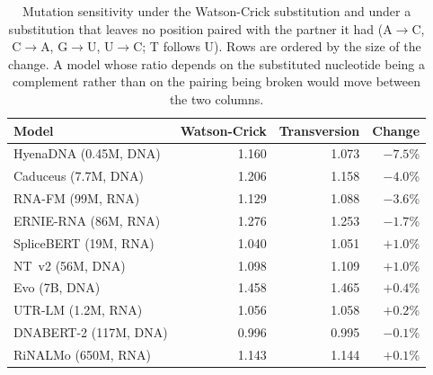 \begin{table}[htbp]
\centering
\caption{Mutation sensitivity under the Watson-Crick substitution and under a
substitution that leaves no position paired with the partner it had (A$\to$C, C$\to$A, G$\to$U, U$\to$C; T
follows U). Rows are ordered by the size of the change. A model whose ratio
depends on the substituted nucleotide being a complement rather than on the
pairing being broken would move between the two columns.}
\label{tab:transversion}
\small
\begin{tabular}{lrrr}
\toprule
\textbf{Model} & \textbf{Watson-Crick} & \textbf{Transversion} & \textbf{Change} \\
\midrule
HyenaDNA (0.45M, DNA)      & 1.160 & 1.073 & $-7.5$\% \\
Caduceus (7.7M, DNA)       & 1.206 & 1.158 & $-4.0$\% \\
RNA-FM (99M, RNA)          & 1.129 & 1.088 & $-3.6$\% \\
ERNIE-RNA (86M, RNA)       & 1.276 & 1.253 & $-1.7$\% \\
SpliceBERT (19M, RNA)      & 1.040 & 1.051 & $+1.0$\% \\
NT~v2 (56M, DNA)           & 1.098 & 1.109 & $+1.0$\% \\
Evo (7B, DNA)              & 1.458 & 1.465 & $+0.4$\% \\
UTR-LM (1.2M, RNA)         & 1.056 & 1.058 & $+0.2$\% \\
DNABERT-2 (117M, DNA)      & 0.996 & 0.995 & $-0.1$\% \\
RiNALMo (650M, RNA)        & 1.143 & 1.144 & $+0.1$\% \\
\bottomrule
\end{tabular}
\end{table}
